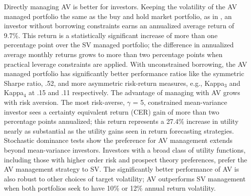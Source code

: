 Directly managing AV is better for investors. Keeping the volatility of the AV managed portfolio the same as the buy and hold market portfolio, as in \citet{moreira_volatility-managed_2017}, an investor without borrowing constraints earns an annualized average return of 9.7\%. This return is a statistically significant increase of more than one percentage point over the SV managed portfolio; the difference in annualized average monthly returns grows to more than two percentage points when practical leverage constraints are applied. With unconstrained borrowing, the AV managed portfolio has significantly better performance ratios like the symmetric Sharpe ratio, .52, and more asymmetric risk-return measures, e.g., Kappa$_{3}$ and Kappa$_{4}$ at .15 and .11 respectively. The advantage of managing with AV grows with risk aversion. The most risk-averse, $\gamma$ = 5, constrained mean-variance investor sees a certainty equivalent return (CER) gain of more than two percentage points annualized; this return represents a 27.4\% increase in utility nearly as substantial as the utility gains seen in return forecasting strategies. \citep{campbell1997econometrics} Stochastic dominance tests show the preference for AV management extends beyond mean-variance investors. Investors with a broad class of utility functions, including those with higher order risk and prospect theory preferences, prefer the AV management strategy to SV. 
The significantly better performance of AV is also robust to other choices of target volatility; AV outperforms SV management when both portfolios seek to have 10\% or 12\% annual return volatility. 

